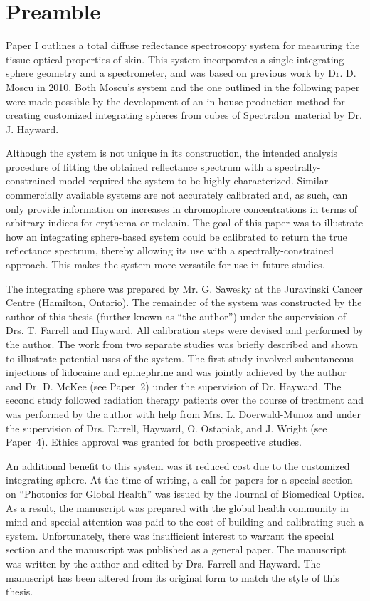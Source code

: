 \label{chap:p1-system}
\section*{Preamble}
Paper I outlines a total diffuse reflectance spectroscopy system for measuring the tissue optical properties of skin. This system incorporates a single integrating sphere geometry and a spectrometer, and was based on previous work by Dr. D. Moscu in 2010.\cite{Moscu2010} Both Moscu's system and the one outlined in the following paper were made possible by the development of an in-house production method for creating customized integrating spheres from cubes of Spectralon\textregistered~material by Dr. J. Hayward.

Although the system is not unique in its construction,\cite{Yudovsky2010a,Yudovsky2011} the intended analysis procedure of fitting the obtained reflectance spectrum with a spectrally-constrained model required the system to be highly characterized. Similar commercially available systems are not accurately calibrated and, as such, can only provide information on increases in chromophore concentrations in terms of arbitrary indices for erythema or melanin. The goal of this paper was to illustrate how an integrating sphere-based system could be calibrated to return the true reflectance spectrum, thereby allowing its use with a spectrally-constrained approach. This makes the system more versatile for use in future studies.

The integrating sphere was prepared by Mr. G. Sawesky at the Juravinski Cancer Centre (Hamilton, Ontario). The remainder of the system was constructed by the author of this thesis (further known as ``the author'') under the supervision of Drs. T. Farrell and Hayward. All calibration steps were devised and performed by the author. The work from two separate studies was briefly described and shown to illustrate potential uses of the system. The first study involved subcutaneous injections of lidocaine and epinephrine and was jointly achieved by the author and Dr. D. McKee (see Paper~2) under the supervision of Dr. Hayward. The second study followed radiation therapy patients over the course of treatment and was performed by the author with help from Mrs. L. Doerwald-Munoz and under the supervision of Drs. Farrell, Hayward, O. Ostapiak, and J. Wright (see Paper~4). Ethics approval was granted for both prospective studies.

An additional benefit to this system was it reduced cost due to the customized integrating sphere. At the time of writing, a call for papers for a special section on ``Photonics for Global Health'' was issued by the Journal of Biomedical Optics. As a result, the manuscript was prepared with the global health community in mind and special attention was paid to the cost of building and calibrating such a system. Unfortunately, there was insufficient interest to warrant the special section and the manuscript was published as a general paper. The manuscript was written by the author and edited by Drs. Farrell and Hayward. The manuscript has been altered from its original form to match the style of this thesis.

